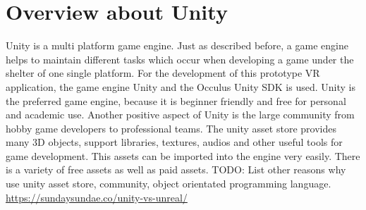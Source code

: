 \section{Overview about Unity}
Unity is a multi platform game engine. Just as described before, a game engine helps to maintain different tasks which occur when developing a game under the shelter of one single platform. 
For the development of this prototype VR application, the game engine Unity and the Occulus Unity SDK is used. Unity is the preferred game engine, because it is beginner friendly and free for personal and academic use. Another positive aspect of Unity is the large community from hobby game developers to professional teams. The unity asset store provides many 3D objects, support libraries, textures, audios and other useful tools for game development. This assets can be imported into the engine very easily. There is a variety of free assets as well as paid assets. TODO: List other reasons why use unity asset store, community, object orientated programming language. \url{https://sundaysundae.co/unity-vs-unreal/}\\
